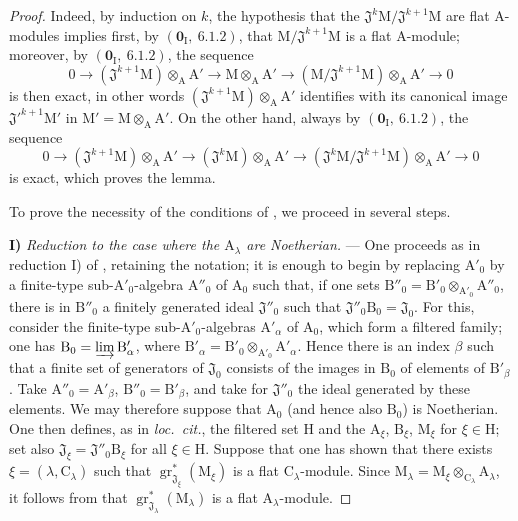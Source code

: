 \begin{proof}

Indeed, by induction on $k$, the hypothesis that the $\mathfrak{J}^k\mathrm{M}/\mathfrak{J}^{k+1}\mathrm{M}$ are flat A-modules implies first, by $(\mathbf{0}_\mathrm{I},~6.1.2)$, that $\mathrm{M}/\mathfrak{J}^{k+1}\mathrm{M}$ is a flat A-module; moreover, by $(\mathbf{0}_\mathrm{I},~6.1.2)$, the sequence
\[
  0\to(\mathfrak{J}^{k+1}\mathrm{M})\otimes_\mathrm{A}\mathrm{A}'\to\mathrm{M}\otimes_\mathrm{A}\mathrm{A}'\to(\mathrm{M}/\mathfrak{J}^{k+1}\mathrm{M})\otimes_\mathrm{A}\mathrm{A}'\to 0
\]
is then exact, in other words $(\mathfrak{J}^{k+1}\mathrm{M})\otimes_\mathrm{A}\mathrm{A}'$ identifies with its canonical image $\mathfrak{J}'^{k+1}\mathrm{M}'$ in $\mathrm{M}'=\mathrm{M}\otimes_\mathrm{A}\mathrm{A}'$. On the other hand, always by $(\mathbf{0}_\mathrm{I},~6.1.2)$, the sequence
\[
  0\to(\mathfrak{J}^{k+1}\mathrm{M})\otimes_\mathrm{A}\mathrm{A}'\to(\mathfrak{J}^k\mathrm{M})\otimes_\mathrm{A}\mathrm{A}'\to(\mathfrak{J}^k\mathrm{M}/\mathfrak{J}^{k+1}\mathrm{M})\otimes_\mathrm{A}\mathrm{A}'\to 0
\]
is exact, which proves the lemma.

To prove the necessity of the conditions of , we proceed in several steps.

\medskip
\noindent\textbf{I)} \emph{Reduction to the case where the $\mathrm{A}_\lambda$
are Noetherian.} --- One proceeds as in reduction I) of
, retaining the notation; it is enough to begin by replacing
$\mathrm{A}'_0$ by a finite-type sub-$\mathrm{A}'_0$-algebra
$\mathrm{A}''_0$ of $\mathrm{A}_0$ such that, if one sets
$\mathrm{B}''_0=\mathrm{B}'_0\otimes_{\mathrm{A}'_0}\mathrm{A}''_0$, there is
in $\mathrm{B}''_0$ a finitely generated ideal $\mathfrak{J}''_0$ such that
$\mathfrak{J}''_0\mathrm{B}_0=\mathfrak{J}_0$. For this, consider the
finite-type sub-$\mathrm{A}'_0$-algebras $\mathrm{A}'_\alpha$ of
$\mathrm{A}_0$, which form a filtered family; one has
$\mathrm{B}_0=\varinjlim\mathrm{B}'_\alpha$, where
$\mathrm{B}'_\alpha=\mathrm{B}'_0\otimes_{\mathrm{A}'_0}\mathrm{A}'_\alpha$.
Hence there is an index $\beta$ such that a finite set of generators of
$\mathfrak{J}_0$ consists of the images in $\mathrm{B}_0$ of elements of
$\mathrm{B}'_\beta$. Take $\mathrm{A}''_0=\mathrm{A}'_\beta$,
$\mathrm{B}''_0=\mathrm{B}'_\beta$, and take for $\mathfrak{J}''_0$ the ideal
generated by these elements. We may therefore suppose that $\mathrm{A}_0$
(and hence also $\mathrm{B}_0$) is Noetherian. One then defines, as in
\emph{loc.\ cit.}, the filtered set $\mathrm{H}$ and the $\mathrm{A}_\xi$,
$\mathrm{B}_\xi$, $\mathrm{M}_\xi$ for $\xi\in\mathrm{H}$; set also
$\mathfrak{J}_\xi=\mathfrak{J}''_0\mathrm{B}_\xi$ for all
$\xi\in\mathrm{H}$. Suppose that one has shown that there exists
$\xi=(\lambda,\mathrm{C}_\lambda)$ such that
$\operatorname{gr}^*_{\mathfrak{J}_\xi}(\mathrm{M}_\xi)$ is a flat
$\mathrm{C}_\lambda$-module. Since
$\mathrm{M}_\lambda=\mathrm{M}_\xi\otimes_{\mathrm{C}_\lambda}
\mathrm{A}_\lambda$, it follows from  that
$\operatorname{gr}^*_{\mathfrak{J}_\lambda}(\mathrm{M}_\lambda)$ is a flat
$\mathrm{A}_\lambda$-module.


\end{proof}

